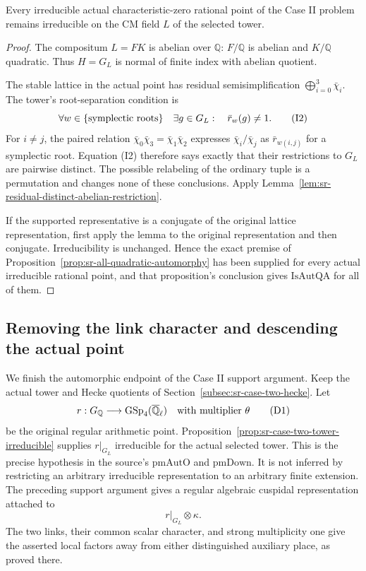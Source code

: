 \begin{srproposition}\label{prop:sr-case-two-tower-irreducible}
Every irreducible actual characteristic-zero rational
point of the Case II problem remains irreducible on
the CM field \(L\) of the selected tower.
\end{srproposition}
\begin{proof}
The compositum \(L=FK\) is abelian over \(\mathbb Q\):
\(F/\mathbb Q\) is abelian and \(K/\mathbb Q\) quadratic.
Thus \(H=G_L\) is normal of finite index with abelian
quotient.

The stable lattice in the actual point has residual
semisimplification
\(\bigoplus_{i=0}^3\bar\chi_i\).
The tower's root-separation condition is
\[
       \forall w\in\{\hbox{symplectic roots}\}\quad
       \exists g\in G_L:\quad \bar r_w(g)\ne1 .
 \tag{I2}
\]
For \(i\ne j\), the paired relation
\(\bar\chi_0\bar\chi_3=\bar\chi_1\bar\chi_2\)
expresses \(\bar\chi_i/\bar\chi_j\) as
\(\bar r_{w(i,j)}\) for a symplectic root.
Equation (I2) therefore says exactly that their
restrictions to \(G_L\) are pairwise distinct.
The possible relabeling of the ordinary tuple is a
permutation and changes none of these conclusions.
Apply Lemma~\ref{lem:sr-residual-distinct-abelian-restriction}.

If the supported representative is a conjugate of the
original lattice representation, first apply the lemma
to the original representation and then conjugate.
Irreducibility is unchanged.
Hence the exact premise of
Proposition~\ref{prop:sr-all-quadratic-automorphy}
has been supplied for every actual irreducible rational
point, and that proposition's conclusion gives
\(\mathrm{IsAutQA}\) for all of them.
\end{proof}



\subsection{Removing the link character and descending the actual point}
\label{subsec:sr-case-two-descent}
We finish the automorphic endpoint of the Case II support
argument. Keep the actual tower and Hecke quotients of
Section~\ref{subsec:sr-case-two-hecke}.
Let
\[
 r:G_{\mathbb Q}\longrightarrow
                   \mathrm{GSp}_4(\overline{\mathbb Q}_\ell)
 \quad\hbox{with multiplier }\theta
 \tag{D1}
\]
be the original regular arithmetic point.
Proposition~\ref{prop:sr-case-two-tower-irreducible} supplies
\(r|_{G_L}\) irreducible for the actual selected tower.
This is the precise hypothesis
in the source's \(\mathrm{pmAutO}\) and
\(\mathrm{pmDown}\).
It is not inferred by restricting an arbitrary irreducible
representation to an arbitrary finite extension.
The preceding support argument gives a regular algebraic
cuspidal representation attached to
\[
                         r|_{G_L}\otimes\kappa .
 \tag{D2}
\]
The two links, their common scalar character, and strong
multiplicity one give the asserted local factors away from
either distinguished auxiliary place, as proved there.

